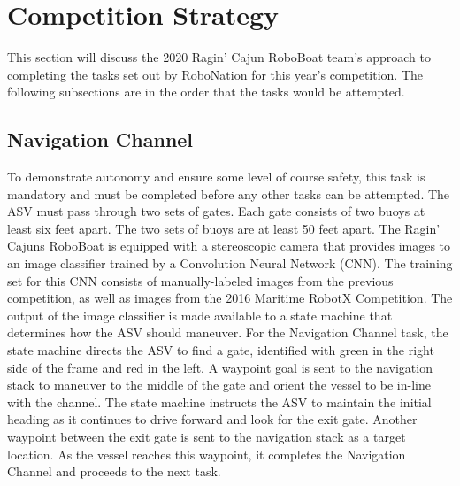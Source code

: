 \documentclass[letterpaper, 12 pt, conference]{ieeeconf}
\begin{document}
\section{Competition Strategy}
This section will discuss the 2020 Ragin' Cajun RoboBoat team's approach to completing the tasks set out by RoboNation for this year's competition. The following subsections are in the order that the tasks would be attempted.

\subsection{Navigation Channel}
\label{NavigationChannel}
To demonstrate autonomy and ensure some level of course safety, this task is mandatory and must be completed before any other tasks can be attempted. The ASV must pass through two sets of gates. Each gate consists of two buoys at least six feet apart. The two sets of buoys are at least 50 feet apart. The Ragin' Cajuns RoboBoat is equipped with a stereoscopic camera that provides images to an image classifier trained by a Convolution Neural Network (CNN). The training set for this CNN consists of manually-labeled images from the previous competition, as well as images from the 2016 Maritime RobotX Competition. The output of the image classifier is made available to a state machine that determines how the ASV should maneuver. For the Navigation Channel task, the state machine directs the ASV to find a gate, identified with green in the right side of the frame and red in the left. A waypoint goal is sent to the navigation stack to maneuver to the middle of the gate and orient the vessel to be in-line with the channel. The state machine instructs the ASV to maintain the initial heading as it continues to drive forward and look for the exit gate. Another waypoint between the exit gate is sent to the navigation stack as a target location. As the vessel reaches this waypoint, it completes the Navigation Channel and proceeds to the next task.
\end{document}
